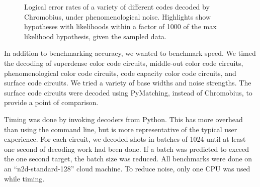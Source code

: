 \documentclass[onecolumn,unpublished,a4paper]{quantumarticle}
\theoremstyle{definition}
\theoremstyle{definition}
\theoremstyle{definition}
\begin{document}
\begin{figure}
    \centering
    \caption{
        Logical error rates of a variety of different codes decoded by Chromobius, under phenomenological noise.
        Highlights show hypotheses with likelihoods within a factor of 1000 of the max likelihood hypothesis, given the sampled data.
    }
    \label{fig:phenom}
\end{figure}

In addition to benchmarking accuracy, we wanted to benchmark speed.
We timed the decoding of superdense color code circuits, middle-out color code circuits, phenomenological color code circuits, code capacity color code circuits, and surface code circuits.
We tried a variety of base widths and noise strengths.
The surface code circuits were decoded using PyMatching, instead of Chromobius, to provide a point of comparison.

Timing was done by invoking decoders from Python.
This has more overhead than using the command line, but is more representative of the typical user experience.
For each circuit, we decoded shots in batches of 1024 until at least one second of decoding work had been done.
If a batch was predicted to exceed the one second target, the batch size was reduced.
All benchmarks were done on an ``n2d-standard-128'' cloud machine.
To reduce noise, only one CPU was used while timing.
\end{document}
